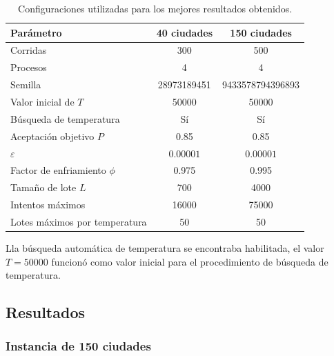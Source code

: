 \documentclass[twoside,11pt]{article}
\begin{document}
\begin{table}[H]
\centering

\footnotesize
\renewcommand{\arraystretch}{1.15}
\setlength{\tabcolsep}{5pt}

\begin{tabular}{|p{5.7cm}|c|c|}
\hline
\textbf{Parámetro} &
\textbf{40 ciudades} &
\textbf{150 ciudades} \\ \hline

Corridas
& 300
& 500 \\ \hline

Procesos
& 4
& 4 \\ \hline

Semilla
& 28973189451
& 9433578794396893 \\ \hline

Valor inicial de $T$
& 50000
& 50000 \\ \hline

Búsqueda de temperatura
& Sí
& Sí \\ \hline

Aceptación objetivo $P$
& 0.85
& 0.85 \\ \hline

$\varepsilon$
& $0.00001$
& $0.00001$ \\ \hline

Factor de enfriamiento $\phi$
& 0.975
& 0.995 \\ \hline

Tamaño de lote $L$
& 700
& 4000 \\ \hline

Intentos máximos
& 16000
& 75000 \\ \hline

Lotes máximos por temperatura
& 50
& 50 \\ \hline

\end{tabular}
\caption{Configuraciones utilizadas para los mejores resultados obtenidos.}
\label{tab:final-config}
\end{table}

Lla búsqueda automática de temperatura se encontraba habilitada, el valor $T=50000$ funcionó como valor inicial para el procedimiento de búsqueda de temperatura. 



\subsection{Resultados}

\subsubsection{Instancia de 150 ciudades}
\end{document}

